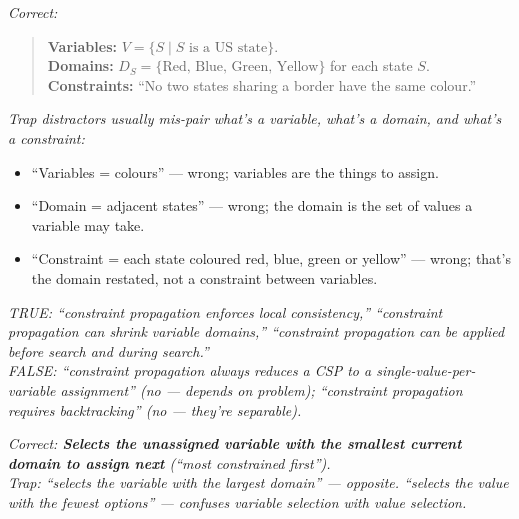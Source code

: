 \documentclass[11pt, a4paper]{article}
\begin{document}
\begin{exambox}
\textit{Correct:}
\begin{quote}
\textbf{Variables:} $V = \{S \mid S \text{ is a US state}\}$.\\
\textbf{Domains:} $D_S = \{\text{Red, Blue, Green, Yellow}\}$ for each state $S$.\\
\textbf{Constraints:} ``No two states sharing a border have the same colour.''
\end{quote}
\textit{Trap distractors usually mis-pair what's a variable, what's a domain, and what's a constraint:}
\begin{itemize}[leftmargin=*, itemsep=0pt, topsep=0pt]
  \item ``Variables = colours'' — wrong; variables are the things to assign.
  \item ``Domain = adjacent states'' — wrong; the domain is the set of values a variable may take.
  \item ``Constraint = each state coloured red, blue, green or yellow'' — wrong; that's the domain restated, not a constraint between variables.
\end{itemize}
\end{exambox}

\begin{exambox}
\textit{TRUE: ``constraint propagation enforces local consistency,'' ``constraint propagation can shrink variable domains,'' ``constraint propagation can be applied before search and during search.''}\\[0.3em]
\textit{FALSE: ``constraint propagation always reduces a CSP to a single-value-per-variable assignment'' (no — depends on problem); ``constraint propagation requires backtracking'' (no — they're separable).}
\end{exambox}

\begin{exambox}
\textit{Correct: \textbf{Selects the unassigned variable with the smallest current domain to assign next} (``most constrained first'').}\\[0.3em]
\textit{Trap: ``selects the variable with the largest domain'' — opposite. ``selects the value with the fewest options'' — confuses variable selection with value selection.}
\end{exambox}
\end{document}
